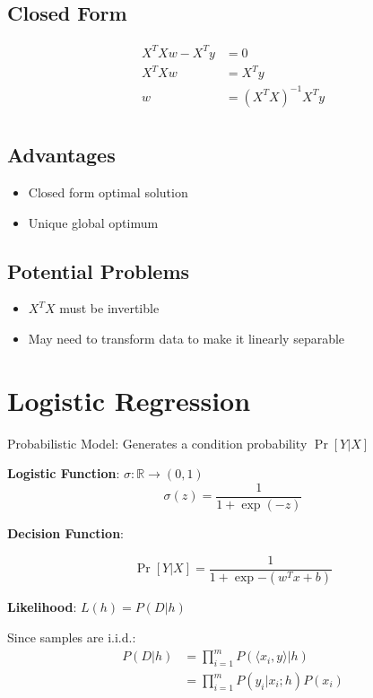 \documentclass[10pt]{article}
\newcommand{\colortext}[2]{{\color{#1} #2}}
\newcommand{\red}[1]{\colortext{red}{#1}}
\begin{document}
\begin{multicols}{3}
  \subsection*{Closed Form}

  \begin{align*}
    X^{T}Xw - X^{T}y &= 0 \\
    X^{T}Xw &= X^{T}y \\
    w &= (X^{T}X)^{-1}X^{T}y \\
  \end{align*}

  \subsection*{Advantages}

  \begin{itemize}
    \item Closed form optimal solution
    \item Unique global optimum
  \end{itemize}

  \subsection*{Potential Problems}

  \begin{itemize}
    \item $X^{T}X$ must be invertible
    \item May need to transform data to make it linearly separable
  \end{itemize}

  \section{Logistic Regression}

  \red{Probabilistic Model}: Generates a condition probability $\Pr[Y\vert X]$

  \textbf{Logistic Function}: $\sigma: \mathbb{R} \rightarrow (0,1) $
  \[ \sigma(z) = \frac{1}{1+\exp(-z)} \]

  \textbf{Decision Function}:

  \[ \Pr[Y\vert X] = \frac{1}{1+\exp{-(w^{T}x + b)}} \]

  \textbf{Likelihood}: $L(h) = P(D\vert h)$

  Since samples are i.i.d.:
  \begin{align*}
    P(D\vert h) &= \prod_{i=1}^m P(\langle x_i,y\rangle \vert h) \\
                &= \prod_{i=1}^{m}P(y_i\vert x_i;h) P(x_i)
  \end{align*}


\end{multicols}
\end{document}
